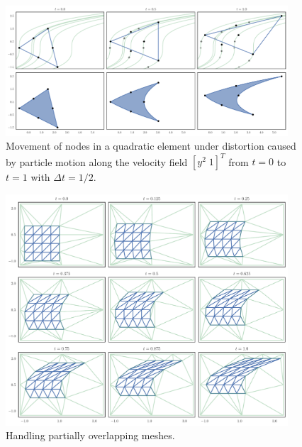 \begin{figure}
  \includegraphics[width=0.9375\textwidth]
                  {../images/curved-mesh/element_distortion.pdf}
  \centering
  \caption{Movement of nodes in a quadratic element under distortion caused
    by particle motion along the velocity field \(\left[ y^2 \; 1 \right]^T\)
    from \(t = 0\) to \(t = 1\) with \(\Delta t = 1/2\).}
  \label{fig:element-distortion}
\end{figure}

\begin{figure}
  \includegraphics[width=0.9375\textwidth]
                  {../images/curved-mesh/mesh_distortion_ext.pdf}
  \centering
  \caption{Handling partially overlapping meshes.}
  \label{fig:mesh-distortion-ext}
\end{figure}


